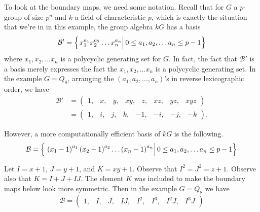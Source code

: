 \documentclass[12pt]{article}
\begin{document}
To look at the boundary maps, we need some notation.
Recall that for $G$ a $p$-group of size $p^n$ and $k$ a field of
characteristic $p$, which is exactly the situation
that we're in in this example, the group algebra $kG$ has
a basis
\begin{equation}
\mathcal{B}'=\left\{\left.\rule{0pt}{12pt} x_1^{a_1}x_2^{a_2}\dots x_n^{a_n}\right|
0\le a_1,a_2,\dots a_n\le p-1\right\}\end{equation}
where $x_1,x_2,\dots x_n$ is a polycyclic generating set for $G$.
In fact, the fact that $\mathcal{B'}$ is a basis merely expresses the
fact the $x_1,x_2,\dots x_n$ is a polycyclic generating set.
In the example $G=Q_8$, arranging the $\left(a_1,a_2,\dots, a_n\right)$'s 
in reverse lexicographic order, we have
\begin{align*}
\mathcal{B}'
&=\left(\begin{array}{cccccccc}1,&x,&y,&xy,&z,&xz,&yz,&xyz\end{array}\right)\\
&=\left(\begin{array}{cccccccc}1,&i,&j,&k,&-1,&-i,&-j,&-k\end{array}\right).
\end{align*}

However, a more computationally efficient basis of $kG$ is the following.
\begin{equation}
\mathcal{B}=\left\{\left.\rule{0pt}{12pt}\left(x_1-1\right)^{a_1}
\left(x_2-1\right)^{a_2}\dots \left(x_n-1\right)^{a_n}\right|
0\le a_1,a_2,\dots a_n\le p-1\right\}\end{equation}

Let $I=x+1$, $J=y+1$, and $K=xy+1$.
Observe that $I^2=J^2=z+1$.
Observe also that $K=I+J+IJ$. The element $K$ was included
to make the boundary maps below look more symmetric.
Then in the example $G=Q_8$ we have
\[\mathcal{B}=\left(\begin{array}{cccccccc}
1,&I,&J,&IJ,&I^2,&I^3,&I^2J,&I^3J\end{array}\right)\]
\end{document}
